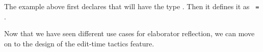 \noindent The example above first declares that  will have the type .
Then it defines it as \mbox{\texttt{ = }}.

Now that we have seen different use cases for elaborator reflection, we can move on to the
design of the edit-time tactics feature.




